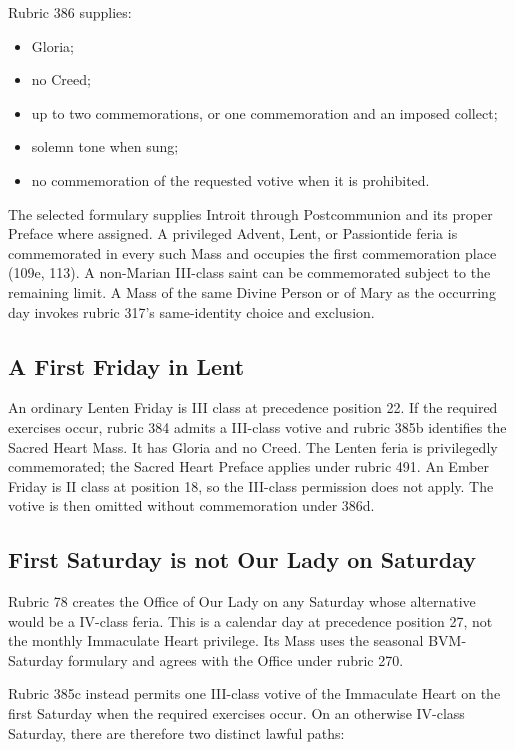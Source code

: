 Rubric 386 supplies:

\begin{itemize}
\item Gloria;
\item no Creed;
\item up to two commemorations, or one commemoration and an imposed collect;
\item solemn tone when sung;
\item no commemoration of the requested votive when it is prohibited.
\end{itemize}

The selected formulary supplies Introit through Postcommunion and its proper Preface where assigned. A privileged Advent, Lent, or Passiontide feria is commemorated in every such Mass and occupies the first commemoration place (109e, 113). A non-Marian III-class saint can be commemorated subject to the remaining limit. A Mass of the same Divine Person or of Mary as the occurring day invokes rubric 317's same-identity choice and exclusion.

\subsection{A First Friday in Lent}

An ordinary Lenten Friday is III class at precedence position 22. If the required exercises occur, rubric 384 admits a III-class votive and rubric 385b identifies the Sacred Heart Mass. It has Gloria and no Creed. The Lenten feria is privilegedly commemorated; the Sacred Heart Preface applies under rubric 491. An Ember Friday is II class at position 18, so the III-class permission does not apply. The votive is then omitted without commemoration under 386d.

\subsection{First Saturday is not Our Lady on Saturday}

Rubric 78 creates the Office of Our Lady on any Saturday whose alternative would be a IV-class feria. This is a calendar day at precedence position 27, not the monthly Immaculate Heart privilege. Its Mass uses the seasonal BVM-Saturday formulary and agrees with the Office under rubric 270.

Rubric 385c instead permits one III-class votive of the Immaculate Heart on the first Saturday when the required exercises occur. On an otherwise IV-class Saturday, there are therefore two distinct lawful paths:

